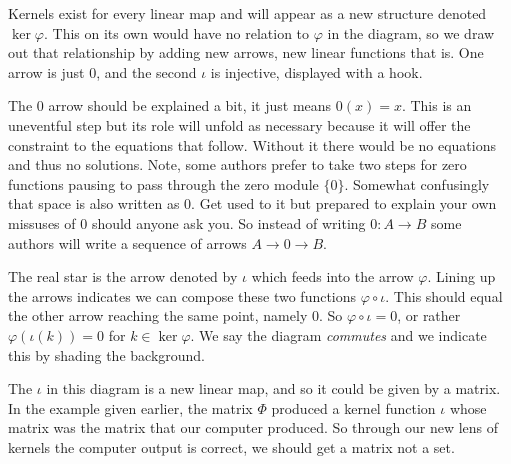 \documentclass[12pt,twoside,dvipsnames,letterpaper]{memoir}
\begin{document}
Kernels exist for every linear map and will appear as a new structure denoted 
$\ker\varphi$.  This on its own would have no relation to $\varphi$ in the diagram, so we draw out that relationship by adding new arrows, new 
linear functions that is.  One arrow is 
just $0$, and the second $\iota$ is injective, displayed with a hook.  
\begin{center}
\end{center}

The $0$ arrow should be explained a bit, it just means $0(x)=x$.  
This is an uneventful step but its role will unfold as necessary because it will
offer the constraint to the equations that follow.  Without it there would be no
equations and thus no solutions.  Note, some authors prefer to take two steps
for zero functions pausing to pass through the zero module $\{0\}$.  Somewhat
confusingly that space is also written as $0$. Get used to it but prepared to
explain your own missuses of $0$ should anyone ask you. So instead of writing
$0:A\to B$ some authors will write a sequence of arrows $A\to 0\to B$.

The real star is the arrow denoted by $\iota$ which feeds into the arrow
$\varphi$.  Lining up the arrows indicates we can compose these two functions
$\varphi\circ \iota$.  This should equal the other arrow reaching the same
point, namely $0$.  So $\varphi\circ \iota=0$, or rather $\varphi(\iota(k))=0$
for $k\in \ker\varphi$.  We say the diagram \emph{commutes} and we indicate this
by shading the background.

The $\iota$ in this diagram is a new linear map, and so it could be 
given by a matrix.  In the example given earlier, the matrix 
$\Phi$ produced a kernel function $\iota$ whose matrix was the matrix
that our computer produced.  So through our new lens of kernels the 
computer output is correct, we should get a matrix not a set.
\end{document}
